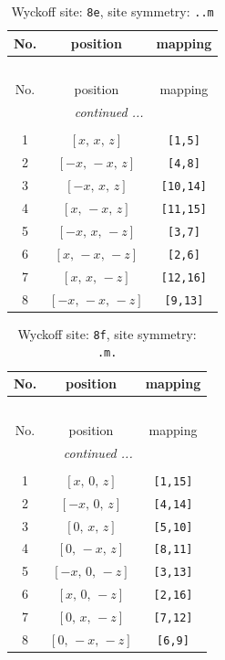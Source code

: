 \documentclass[fleqn,8pt]{jsarticle}
\begin{document}
\begin{longtable}{ccc}
\caption{Wyckoff site: {\tt 8e}, site symmetry: {\tt ..m}}
 \\
 \hline \hline
No. & position & mapping \\ \hline \endfirsthead

\multicolumn{2}{l}{\tablename\ \thetable{}} \\
 \hline \hline
No. & position & mapping \\ \hline \endhead

 \hline \hline
\multicolumn{2}{r}{\footnotesize\it continued ...} \\ \endfoot

 \hline \hline
\multicolumn{2}{r}{} \\ \endlastfoot

1 & $\left[ x,\, x,\, z \right]$ & {\tt [1,5]} \\ \hline
2 & $\left[ - x,\, - x,\, z \right]$ & {\tt [4,8]} \\ \hline
3 & $\left[ - x,\, x,\, z \right]$ & {\tt [10,14]} \\ \hline
4 & $\left[ x,\, - x,\, z \right]$ & {\tt [11,15]} \\ \hline
5 & $\left[ - x,\, x,\, - z \right]$ & {\tt [3,7]} \\ \hline
6 & $\left[ x,\, - x,\, - z \right]$ & {\tt [2,6]} \\ \hline
7 & $\left[ x,\, x,\, - z \right]$ & {\tt [12,16]} \\ \hline
8 & $\left[ - x,\, - x,\, - z \right]$ & {\tt [9,13]} \\
\end{longtable}
\renewcommand{\arraystretch}{1.2}
\begin{longtable}{ccc}
\caption{Wyckoff site: {\tt 8f}, site symmetry: {\tt .m.}}
 \\
 \hline \hline
No. & position & mapping \\ \hline \endfirsthead

\multicolumn{2}{l}{\tablename\ \thetable{}} \\
 \hline \hline
No. & position & mapping \\ \hline \endhead

 \hline \hline
\multicolumn{2}{r}{\footnotesize\it continued ...} \\ \endfoot

 \hline \hline
\multicolumn{2}{r}{} \\ \endlastfoot

1 & $\left[ x,\, 0,\, z \right]$ & {\tt [1,15]} \\ \hline
2 & $\left[ - x,\, 0,\, z \right]$ & {\tt [4,14]} \\ \hline
3 & $\left[ 0,\, x,\, z \right]$ & {\tt [5,10]} \\ \hline
4 & $\left[ 0,\, - x,\, z \right]$ & {\tt [8,11]} \\ \hline
5 & $\left[ - x,\, 0,\, - z \right]$ & {\tt [3,13]} \\ \hline
6 & $\left[ x,\, 0,\, - z \right]$ & {\tt [2,16]} \\ \hline
7 & $\left[ 0,\, x,\, - z \right]$ & {\tt [7,12]} \\ \hline
8 & $\left[ 0,\, - x,\, - z \right]$ & {\tt [6,9]} \\
\end{longtable}
\end{document}
